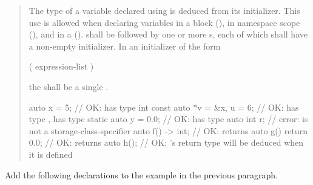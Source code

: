 \begin{quote}
\pnum
The type of a variable declared using 
is deduced from its initializer.
% 
This use is allowed when declaring variables in a block (),
in namespace scope (), and in a 
 ().
%
%
   shall be followed by one or more s,
each of which shall have a non-empty initializer.
%
In an initializer of the form
\begin{codeblock}
( expression-list )
\end{codeblock}
the  shall be a single 
.
% 
\enterexample
\begin{codeblock}
auto x = 5;                // OK:  has type int
const auto *v = &x, u = 6; // OK:  has type ,  has type 
static auto y = 0.0;       // OK:  has type 
auto int r;                // error:  is not a storage-class-specifier
auto f() -> int;           // OK:  returns 
auto g() { return 0.0; }   // OK:  returns 
auto h();                  // OK: 's return type will be deduced when it is defined
\end{codeblock}
\exitexample
\end{quote}

Add the following declarations to the example in the previous paragraph.

